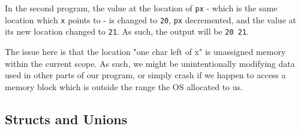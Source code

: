 \documentclass[a4paper]{scrartcl}
\begin{document}
In the second program, the value at the location of \texttt{px} - which is the
same location which \texttt{x} points to - is changed to \texttt{20},
\texttt{px} decremented, and the value at its new location changed to
\texttt{21}. As such, the output will be \texttt{20 21}.

The issue here is that the location "one char left of x" is unassigned memory
within the current scope. As such, we might be unintentionally modifying data
used in other parts of our program, or simply crash if we happen to access a
memory block which is outside the range the OS allocated to us.


\subsection{Structs and Unions}
\end{document}
